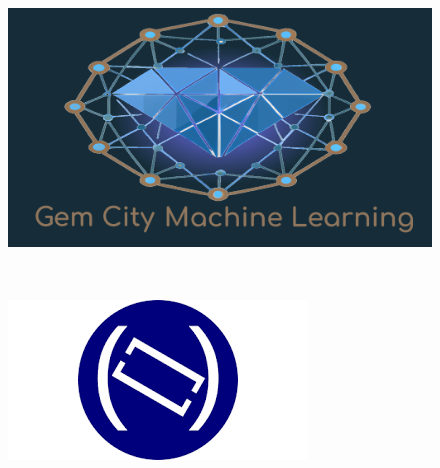 \documentclass[
  letterpaper,
  DIV=11,
  numbers=noendperiod]{scrartcl}
\begin{document}
\vspace{-1.05\baselineskip}

\begin{figure}

\begin{minipage}[b]{0.05\linewidth}

{\centering 

~

}

\end{minipage}%
%
\begin{minipage}[b]{0.28\linewidth}

{\centering 

\includegraphics{../img/gem_city_ml_social.png}

}

\end{minipage}%
%
\begin{minipage}[b]{0.02\linewidth}

{\centering 

~

}

\end{minipage}%
%
\begin{minipage}[b]{0.30\linewidth}

{\centering 

\includegraphics{../img/DDLLogo.png}

}
\end{minipage}
\end{figure}
\end{document}
